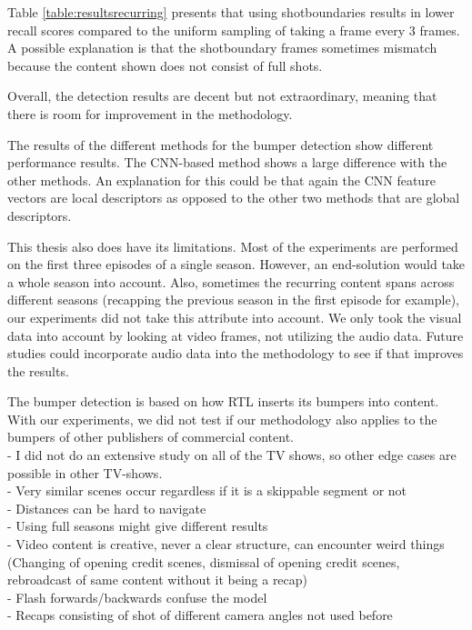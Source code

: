 \documentclass{report}
\begin{document}
Table \ref{table:resultsrecurring} presents that using shotboundaries results in lower recall scores compared to the uniform sampling of taking a frame every 3 frames. A possible explanation is that the shotboundary frames sometimes mismatch because the content shown does not consist of full shots.

Overall, the detection results are decent but not extraordinary, meaning that there is room for improvement in the methodology. 

The results of the different methods for the bumper detection show different performance results. The CNN-based method shows a large difference with the other methods. An explanation for this could be that again the CNN feature vectors are local descriptors as opposed to the other two methods that are global descriptors.

This thesis also does have its limitations. Most of the experiments are performed on the first three episodes of a single season. However, an end-solution would take a whole season into account. Also, sometimes the recurring content spans across different seasons (recapping the previous season in the first episode for example), our experiments did not take this attribute into account. We only took the visual data into account by looking at video frames, not utilizing the audio data. Future studies could incorporate audio data into the methodology to see if that improves the results.

The bumper detection is based on how RTL inserts its bumpers into content. With our experiments, we did not test if our methodology also applies to the bumpers of other publishers of commercial content.
\\
\iffalse
- I did not do an extensive study on all of the TV shows, so other edge cases are possible in other TV-shows.\\
- Very similar scenes occur regardless if it is a skippable segment or not\\
- Distances can be hard to navigate\\
- Using full seasons might give different results\\
- Video content is creative, never a clear structure, can encounter weird things (Changing of opening credit scenes, dismissal of opening credit scenes, rebroadcast of same content without it being a recap)\\
- Flash forwards/backwards confuse the model\\
- Recaps consisting of shot of different camera angles not used before
\end{document}
